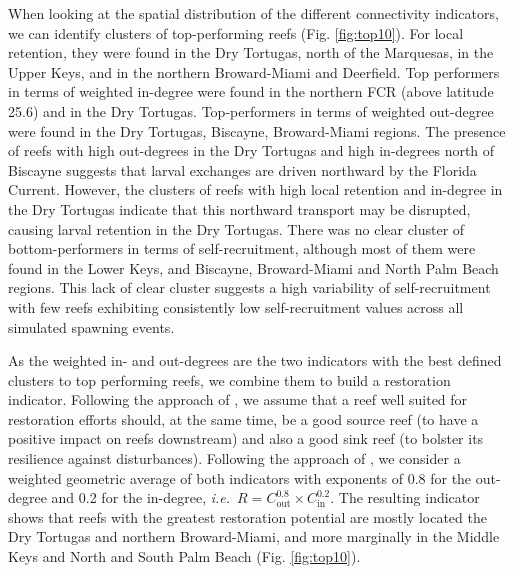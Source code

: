 \documentclass[preprint,12pt,authoryear]{elsarticle}
\newcommand{\ie}{{\it i.e.}\ }
\begin{document}
When looking at the spatial distribution of the different connectivity indicators, we can identify clusters of top-performing reefs (Fig. \ref{fig:top10}). For local retention, they were found in the Dry Tortugas, north of the Marquesas, in the Upper Keys, and in the northern Broward-Miami and Deerfield. Top performers in terms of weighted in-degree were found in the northern FCR (above latitude 25.6) and in the Dry Tortugas. Top-performers in terms of weighted out-degree were found in the Dry Tortugas, Biscayne, Broward-Miami regions. The presence of reefs with high out-degrees in the Dry Tortugas and high in-degrees north of Biscayne suggests that larval exchanges are driven northward by the Florida Current. However, the clusters of reefs with high local retention and in-degree in the Dry Tortugas indicate that this northward transport may be disrupted, causing larval retention in the Dry Tortugas. There was no clear cluster of bottom-performers in terms of self-recruitment, although most of them were found in the Lower Keys, and Biscayne, Broward-Miami and North Palm Beach regions. This lack of clear cluster suggests a high variability of self-recruitment with few reefs exhibiting consistently low self-recruitment values across all simulated spawning events.

As the weighted in- and out-degrees are the two indicators with the best defined clusters to top performing reefs, we combine them to build a restoration indicator. Following the approach of \cite{frys2020fine}, we assume that a reef well suited for restoration efforts should, at the same time, be a good source reef (to have a positive impact on reefs downstream) and also a good sink reef (to bolster its resilience against disturbances). Following the approach of \cite{tnc2024}, we consider a weighted geometric average of both indicators with exponents of 0.8 for the out-degree and 0.2 for the in-degree, \ie $R = C_\text{out}^{0.8} \times C_\text{in}^{0.2}$. The resulting indicator shows that reefs with the greatest restoration potential are mostly located the Dry Tortugas and northern Broward-Miami, and more marginally in the Middle Keys and North and South Palm Beach (Fig. \ref{fig:top10}).
\end{document}
